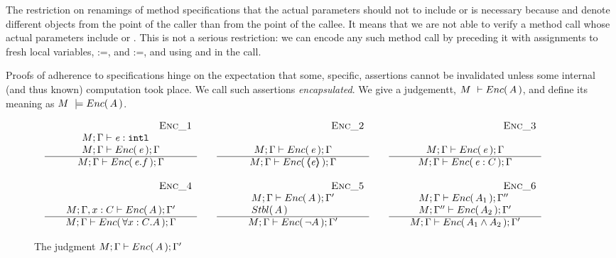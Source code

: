 The restriction on renamings of method specifications that  the actual parameters should not to include   or  
 is necessary because  and   denote different objects from the point of the caller  than from the point of the callee.
It means that we are not able to verify a method call whose actual parameters include  or . 
This is not a serious restriction: we can encode any such method call by preceding it with assignments to fresh local variables, :=, and   :=, and using  and  in the call.



{
Proofs of adherence to {\SpecLang specifications  hinge on the expectation that some, 
specific, assertions cannot be invalidated unless some 
} internal (and thus known) computation took place. 
{We call such assertions   \emph{encapsulated}.}
}
We give a judgementt,  $M\ \vdash  {\ensuremath Enc(\, A\, )}$, and define its meaning as $M\ \models  \encaps{A}$.


\begin{figure}[thb]
$
\begin{array}{l}
\begin{array}{lclcl}
\begin{array}{c} \strut \ \ \ \ \ \ \ \ \ \ \ \ \ \ \ \ \ \ \ \ \ \ \ \ \ \ \ \ \ \ \ {{\mbox{~ \strut  {\sc{Enc\_1}}}}} \\   
\begin{array}{l}
M; \Gamma \vdash \mathit{e} : \mbox{\normalfont{\texttt{intl}}} \\
M; \Gamma \vdash {\ensuremath Enc(\, \mathit{e}\, )}; \Gamma
\end{array}
 \\ \hline 
M; \Gamma \vdash {\ensuremath Enc(\, \mathit{e}.f\, )}; \Gamma
 \end{array}
& &
\begin{array}{c} \strut \ \ \ \ \ \ \ \ \ \ \ \ \ \ \ \ \ \ \ \ \ \ \ \ \ \ \ \ \ \ \ {{\mbox{~ \strut  {\sc{Enc\_2}}}}} \\   
\\
M; \Gamma \vdash {\ensuremath Enc(\, \mathit{e}\, )}; \Gamma 
 \\ \hline 
M; \Gamma \vdash {\ensuremath Enc(\, \ensuremath{\langle\!\!\langle \mathit{e} \rangle\!\!\rangle}\, )}; \Gamma
 \end{array}
& &
\begin{array}{c} \strut \ \ \ \ \ \ \ \ \ \ \ \ \ \ \ \ \ \ \ \ \ \ \ \ \ \ \ \ \ \ \ {{\mbox{~ \strut  {\sc{Enc\_3}}}}} \\   
\\
M; \Gamma \vdash {\ensuremath Enc(\, \mathit{e}\, )}; \Gamma 
 \\ \hline 
M; \Gamma \vdash {\ensuremath Enc(\, \mathit{e}:C\, )}; \Gamma
 \end{array}
\\ \\ 
\begin{array}{c} \strut \ \ \ \ \ \ \ \ \ \ \ \ \ \ \ \ \ \ \ \ \ \ \ \ \ \ \ \ \ \ \ {{\mbox{~ \strut  {\sc{Enc\_4}}}}} \\   
\\
M; \Gamma, {x:C} \vdash {\ensuremath Enc(\, A\, )}; \Gamma' 
 \\ \hline 
M; \Gamma \vdash {\ensuremath Enc(\, \forall {x:C}. A\, )}; \Gamma
 \end{array}
&   &
\begin{array}{c} \strut \ \ \ \ \ \ \ \ \ \ \ \ \ \ \ \ \ \ \ \ \ \ \ \ \ \ \ \ \ \ \ {{\mbox{~ \strut  {\sc{Enc\_5}}}}} \\    
\begin{array}{l}
M; \Gamma \vdash {\ensuremath Enc(\, A\, )}; \Gamma'\\  {Stbl(\, A\, )}
\end{array}
 \\ \hline 
M; \Gamma \vdash {\ensuremath Enc(\,  \neg A\, )}; \Gamma'  
 \end{array}
&    &
\begin{array}{c} \strut \ \ \ \ \ \ \ \ \ \ \ \ \ \ \ \ \ \ \ \ \ \ \ \ \ \ \ \ \ \ \ {{\mbox{~ \strut  {\sc{Enc\_6}}}}} \\   
\begin{array}{l}
M; \Gamma \vdash {\ensuremath Enc(\, A_1\, )}; \Gamma''   \\
  M; \Gamma'' \vdash {\ensuremath Enc(\,  A_2\, )}; \Gamma' 
  \end{array} 
 \\ \hline 
M; \Gamma \vdash {\ensuremath Enc(\, A_1 \wedge A_2\, )}; \Gamma'
 \end{array}
\end{array}
\end{array}
$
\caption{The judgment $M; \Gamma \vdash {\ensuremath Enc(\, A\, )}; \Gamma'$}
\label{f:encaps}
\end{figure}
 

